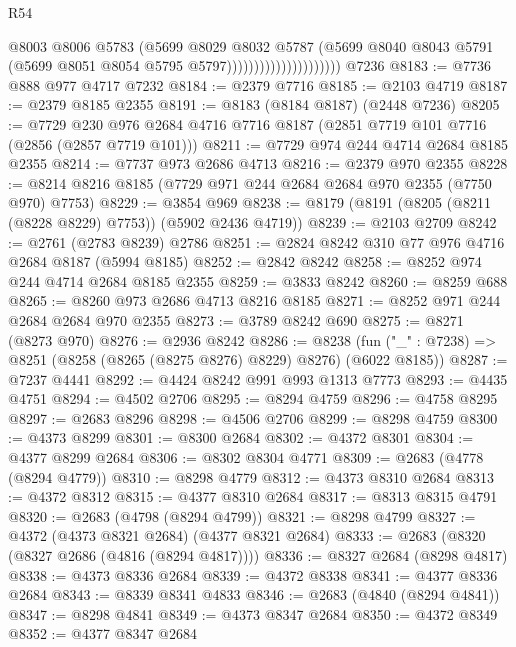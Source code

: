 \begin{lexlean}{R54}
\begin{coremodule}
                                        @8003
                                        @8006
                                        @5783
                                        (@5699
                                          @8029
                                          @8032
                                          @5787
                                          (@5699
                                            @8040
                                            @8043
                                            @5791
                                            (@5699 @8051 @8054 @5795 @5797)))))))))))))))))))))
    @7236
@8183 := @7736 @888 @977 @4717 @7232
@8184 := @2379 @7716
@8185 := @2103 @4719
@8187 := @2379 @8185 @2355
@8191 := @8183 (@8184 @8187) (@2448 @7236)
@8205 := @7729 @230 @976 @2684 @4716 @7716 @8187 (@2851 @7719 @101 @7716 (@2856 (@2857 @7719 @101)))
@8211 := @7729 @974 @244 @4714 @2684 @8185 @2355
@8214 := @7737 @973 @2686 @4713
@8216 := @2379 @970 @2355
@8228 := @8214 @8216 @8185 (@7729 @971 @244 @2684 @2684 @970 @2355 (@7750 @970) @7753)
@8229 := @3854 @969
@8238 := @8179 (@8191 (@8205 (@8211 (@8228 @8229) @7753)) (@5902 @2436 @4719))
@8239 := @2103 @2709
@8242 := @2761 (@2783 @8239) @2786
@8251 := @2824 @8242 @310 @77 @976 @4716 @2684 @8187 (@5994 @8185)
@8252 := @2842 @8242
@8258 := @8252 @974 @244 @4714 @2684 @8185 @2355
@8259 := @3833 @8242
@8260 := @8259 @688
@8265 := @8260 @973 @2686 @4713 @8216 @8185
@8271 := @8252 @971 @244 @2684 @2684 @970 @2355
@8273 := @3789 @8242 @690
@8275 := @8271 (@8273 @970)
@8276 := @2936 @8242
@8286 := @8238 (fun ("_" : @7238) => @8251 (@8258 (@8265 (@8275 @8276) @8229) @8276) (@6022 @8185))
@8287 := @7237 @4441
@8292 := @4424 @8242 @991 @993 @1313 @7773
@8293 := @4435 @4751
@8294 := @4502 @2706
@8295 := @8294 @4759
@8296 := @4758 @8295
@8297 := @2683 @8296
@8298 := @4506 @2706
@8299 := @8298 @4759
@8300 := @4373 @8299
@8301 := @8300 @2684
@8302 := @4372 @8301
@8304 := @4377 @8299 @2684
@8306 := @8302 @8304 @4771
@8309 := @2683 (@4778 (@8294 @4779))
@8310 := @8298 @4779
@8312 := @4373 @8310 @2684
@8313 := @4372 @8312
@8315 := @4377 @8310 @2684
@8317 := @8313 @8315 @4791
@8320 := @2683 (@4798 (@8294 @4799))
@8321 := @8298 @4799
@8327 := @4372 (@4373 @8321 @2684) (@4377 @8321 @2684)
@8333 := @2683 (@8320 (@8327 @2686 (@4816 (@8294 @4817))))
@8336 := @8327 @2684 (@8298 @4817)
@8338 := @4373 @8336 @2684
@8339 := @4372 @8338
@8341 := @4377 @8336 @2684
@8343 := @8339 @8341 @4833
@8346 := @2683 (@4840 (@8294 @4841))
@8347 := @8298 @4841
@8349 := @4373 @8347 @2684
@8350 := @4372 @8349
@8352 := @4377 @8347 @2684

\end{coremodule}
\end{lexlean}
